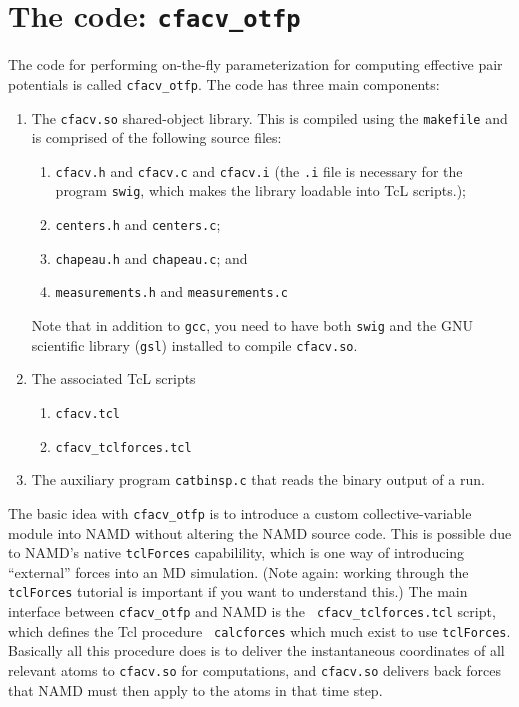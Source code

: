 \documentclass[11pt]{article}
\begin{document}
\section{The code: {\tt cfacv\_otfp}}

The code for performing on-the-fly parameterization for computing effective pair potentials is called {\tt cfacv\_otfp}.  The code has three main components:
\begin{enumerate}
\item The {\tt cfacv.so} shared-object library.  This is compiled using the {\tt makefile} and is comprised of the following source files:
\begin{enumerate}
\item {\tt cfacv.h} and {\tt cfacv.c} and {\tt cfacv.i} (the {\tt .i} file is necessary for the program {\tt swig}, which makes the library loadable into TcL scripts.);
\item {\tt centers.h} and {\tt centers.c};
\item {\tt chapeau.h} and {\tt chapeau.c}; and
\item {\tt measurements.h} and {\tt measurements.c}
\end{enumerate}
Note that in addition to {\tt gcc}, you need to have both {\tt swig}
and the GNU scientific library ({\tt gsl}) installed to compile {\tt cfacv.so}.
\item The associated TcL scripts
\begin{enumerate}
\item {\tt cfacv.tcl}
\item {\tt cfacv\_tclforces.tcl}
\end{enumerate}
\item The auxiliary program {\tt catbinsp.c} that reads the binary output of a run.
\end{enumerate}

The basic idea with {\tt cfacv\_otfp} is to introduce a custom
collective-variable module into NAMD without altering the NAMD source
code.  This is possible due to NAMD's native {\tt tclForces}
capabilility, which is one way of introducing ``external'' forces into
an MD simulation.  (Note again: working through the {\tt tclForces}
tutorial is important if you want to understand this.)  The main
interface between {\tt cfacv\_otfp} and NAMD is the {\tt
cfacv\_tclforces.tcl} script, which defines the Tcl procedure {\tt
calcforces} which much exist to use {\tt tclForces}.  Basically all
this procedure does is to deliver the instantaneous coordinates of all
relevant atoms to {\tt cfacv.so} for computations, and {\tt cfacv.so}
delivers back forces that NAMD must then apply to the atoms in that
time step.
\end{document}
